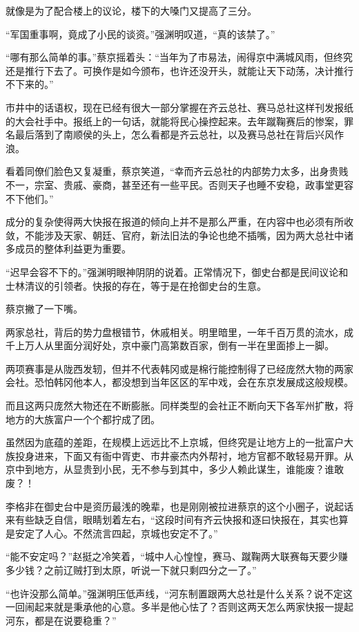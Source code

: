 就像是为了配合楼上的议论，楼下的大嗓门又提高了三分。

“军国重事啊，竟成了小民的谈资。”强渊明叹道，“真的该禁了。”

“哪有那么简单的事。”蔡京摇着头：“当年为了市易法，闹得京中满城风雨，但终究还是推行下去了。可换作是如今颁布，也许还没开头，就能让天下动荡，决计推行不下来的。”

市井中的话语权，现在已经有很大一部分掌握在齐云总社、赛马总社这样刊发报纸的大会社手中。报纸上的一句话，就能将民心操控起来。去年蹴鞠赛后的惨案，罪名最后落到了南顺侯的头上，怎么看都是齐云总社，以及赛马总社在背后兴风作浪。

看着同僚们脸色又复凝重，蔡京笑道，“幸而齐云总社的内部势力太多，出身贵贱不一，宗室、贵戚、豪商，甚至还有一些平民。否则天子也睡不安稳，政事堂更容不下他们。”

成分的复杂使得两大快报在报道的倾向上并不是那么严重，在内容中也必须有所收敛，不能涉及天家、朝廷、官府，新法旧法的争论也绝不插嘴，因为两大总社中诸多成员的整体利益更为重要。

“迟早会容不下的。”强渊明眼神阴阴的说着。正常情况下，御史台都是民间议论和士林清议的引领者。快报的存在，等于是在抢御史台的生意。

蔡京撇了一下嘴。

两家总社，背后的势力盘根错节，休戚相关。明里暗里，一年千百万贯的流水，成千上万人从里面分润好处，京中豪门高第数百家，倒有一半在里面掺上一脚。

两项赛事是从陇西发轫，但并不代表韩冈或是棉行能控制得了已经庞然大物的两家会社。恐怕韩冈他本人，都没想到当年区区的军中戏，会在东京发展成这般规模。

而且这两只庞然大物还在不断膨胀。同样类型的会社正不断向天下各军州扩散，将地方的大族富户一个个都拧成了团。

虽然因为底蕴的差距，在规模上远远比不上京城，但终究是让地方上的一批富户大族投身进来，下面又有衙中胥吏、市井豪杰内外帮衬，地方官都不敢轻易开罪。从京中到地方，从显贵到小民，无不参与到其中，多少人赖此谋生，谁能废？谁敢废？！

李格非在御史台中是资历最浅的晚辈，也是刚刚被拉进蔡京的这个小圈子，说起话来有些缺乏自信，眼睛划着左右，“这段时间有齐云快报和逐曰快报在，其实也算是安定了人心。不然流言四起，京城也安定不了。”

“能不安定吗？”赵挺之冷笑着，“城中人心惶惶，赛马、蹴鞠两大联赛每天要少赚多少钱？之前辽贼打到太原，听说一下就只剩四分之一了。”

“也许没那么简单。”强渊明压低声线，“河东制置跟两大总社是什么关系？说不定这一回闹起来就是秉承他的心意。多半是他心怯了？否则这两天怎么两家快报一提起河东，都是在说要稳重？”

